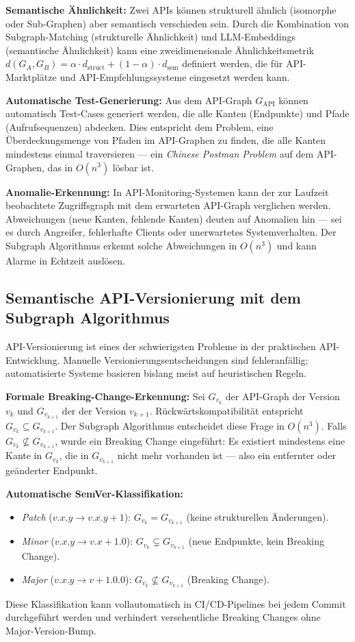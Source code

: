 ﻿\documentclass[a4paper,12pt]{article}
\theoremstyle{definition}
\begin{document}
\textbf{Semantische Ähnlichkeit:} Zwei APIs können strukturell ähnlich (isomorphe
oder Sub-Graphen) aber semantisch verschieden sein. Durch die Kombination von
Subgraph-Matching (strukturelle Ähnlichkeit) und LLM-Embeddings (semantische
Ähnlichkeit) kann eine zweidimensionale Ähnlichkeitsmetrik
$d(G_A, G_B) = \alpha \cdot d_{\mathrm{struct}} + (1-\alpha) \cdot d_{\mathrm{sem}}$
definiert werden, die für API-Marktplätze und API-Empfehlungssysteme eingesetzt
werden kann.

\textbf{Automatische Test-Generierung:} Aus dem API-Graph $G_{\mathrm{API}}$ können
automatisch Test-Cases generiert werden, die alle Kanten (Endpunkte) und Pfade
(Aufrufsequenzen) abdecken. Dies entspricht dem Problem, eine Überdeckungsmenge
von Pfaden im API-Graphen zu finden, die alle Kanten mindestens einmal traversieren ---
ein \emph{Chinese Postman Problem} auf dem API-Graphen, das in $O(n^3)$ lösbar ist.

\textbf{Anomalie-Erkennung:} In API-Monitoring-Systemen kann der zur Laufzeit
beobachtete Zugriffsgraph mit dem erwarteten API-Graph verglichen werden.
Abweichungen (neue Kanten, fehlende Kanten) deuten auf Anomalien hin --- sei es
durch Angreifer, fehlerhafte Clients oder unerwartetes Systemverhalten.
Der Subgraph Algorithmus erkennt solche Abweichungen in $O(n^3)$ und kann
Alarme in Echtzeit auslösen.

\subsection{Semantische API-Versionierung mit dem Subgraph Algorithmus}

API-Versionierung ist eines der schwierigsten Probleme in der praktischen API-Entwicklung.
Manuelle Versionierungsentscheidungen sind fehleranfällig; automatisierte Systeme
basieren bislang meist auf heuristischen Regeln.

\textbf{Formale Breaking-Change-Erkennung:} Sei $G_{v_k}$ der API-Graph der Version $v_k$
und $G_{v_{k+1}}$ der der Version $v_{k+1}$. Rückwärtskompatibilität entspricht
$G_{v_k} \subseteq G_{v_{k+1}}$. Der Subgraph Algorithmus entscheidet diese Frage
in $O(n^3)$. Falls $G_{v_k} \not\subseteq G_{v_{k+1}}$, wurde ein Breaking Change
eingeführt: Es existiert mindestens eine Kante in $G_{v_k}$, die in $G_{v_{k+1}}$
nicht mehr vorhanden ist --- also ein entfernter oder geänderter Endpunkt.

\textbf{Automatische SemVer-Klassifikation:}
\begin{itemize}
  \item \emph{Patch} ($v.x.y \to v.x.y+1$): $G_{v_k} = G_{v_{k+1}}$ (keine strukturellen Änderungen).
  \item \emph{Minor} ($v.x.y \to v.x+1.0$): $G_{v_k} \subsetneq G_{v_{k+1}}$ (neue Endpunkte,
    kein Breaking Change).
  \item \emph{Major} ($v.x.y \to v+1.0.0$): $G_{v_k} \not\subseteq G_{v_{k+1}}$ (Breaking Change).
\end{itemize}
Diese Klassifikation kann vollautomatisch in CI/CD-Pipelines bei jedem Commit
durchgeführt werden und verhindert versehentliche Breaking Changes ohne Major-Version-Bump.
\end{document}
